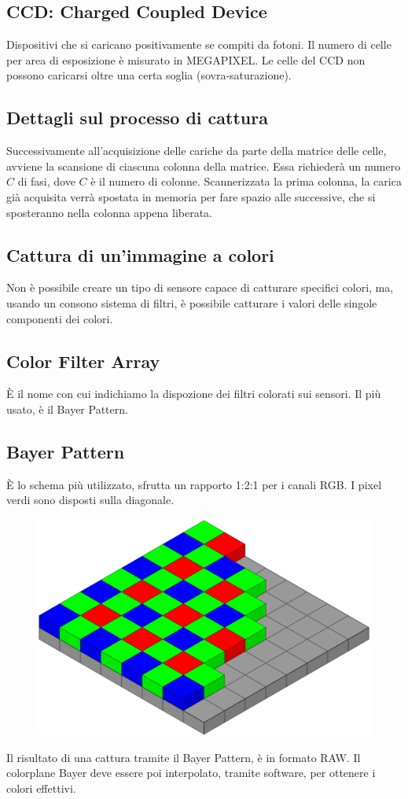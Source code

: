 \documentclass{report}
\begin{document}
	\subsection{CCD: Charged Coupled Device}
	Dispositivi che si caricano positivamente se compiti da fotoni. Il numero di celle per area di esposizione è misurato in MEGAPIXEL. Le celle del CCD non possono caricarsi oltre una certa soglia (sovra-saturazione).
	
	\subsection{Dettagli sul processo di cattura}
	Successivamente all'acquisizione delle cariche da parte della matrice delle celle, avviene la scansione di ciascuna colonna della matrice. Essa richiederà un numero $C$ di fasi, dove $C$ è il numero di colonne. Scannerizzata la prima colonna, la carica già acquisita verrà spostata in memoria per fare spazio alle successive, che si sposteranno nella colonna appena liberata.
	
	\subsection{Cattura di un'immagine a colori}
	Non è possibile creare un tipo di sensore capace di catturare specifici colori, ma, usando un consono sistema di filtri, è possibile catturare i valori delle singole componenti dei colori.
	
	\subsection{Color Filter Array}
	È il nome con cui indichiamo la dispozione dei filtri colorati sui sensori. Il più usato, è il Bayer Pattern.
	
	\subsection{Bayer Pattern}
	È lo schema più utilizzato, sfrutta un rapporto 1:2:1 per i canali RGB. I pixel verdi sono disposti sulla diagonale.
	
	\begin{figure}[htp]
		\centering
		\includegraphics[width=0.5\linewidth]{bayer.png}
	\end{figure}
	Il risultato di una cattura tramite il Bayer Pattern, è in formato RAW. Il colorplane Bayer deve essere poi interpolato, tramite software, per ottenere i colori effettivi.
	
\end{document}
